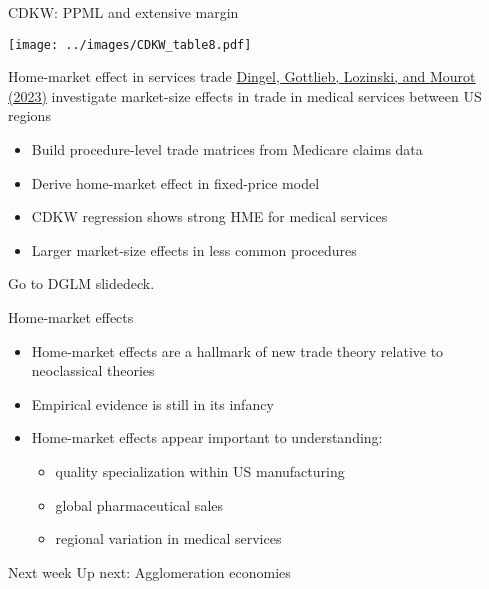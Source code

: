 \documentclass[11pt,notes=hide,aspectratio=169]{beamer}
\begin{document}
\begin{frame}{CDKW: PPML and extensive margin}
\begin{center}\texttt{[image: ../images/CDKW\_table8.pdf]}\end{center}
\end{frame}
\begin{frame}{Home-market effect in services trade}
\href{http://www.jdingel.com/research/DGLM_MSTMS.pdf}{Dingel, Gottlieb, Lozinski, and Mourot (2023)}
investigate market-size effects in trade in medical services between US regions
\begin{itemize}
\item Build procedure-level trade matrices from Medicare claims data
\item Derive home-market effect in fixed-price model
\item CDKW regression shows strong HME for medical services
\item Larger market-size effects in less common procedures
\end{itemize}
Go to DGLM slidedeck.
\end{frame}
\begin{frame}{Home-market effects}
\begin{itemize}
	\item Home-market effects are a hallmark of new trade theory relative to neoclassical theories
	\item Empirical evidence is still in its infancy
	\item Home-market effects appear important to understanding:
	\begin{itemize}
		\item quality specialization within US manufacturing
		\item global pharmaceutical sales
		\item regional variation in medical services
	\end{itemize}
\end{itemize}
\end{frame}
\begin{frame}{Next week}
Up next: Agglomeration economies
\end{frame}
\end{document}
